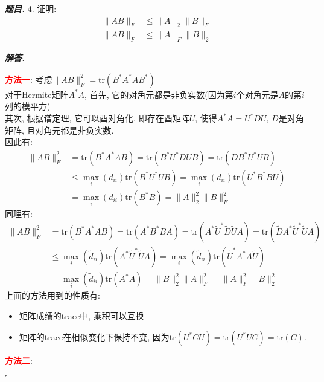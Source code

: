 \documentclass[10pt, a4paper, oneside]{ctexart}
\newcommand{\norm}[1]{\| #1 \|}
\newenvironment{problem}{\begin{framed}\par\noindent\textbf{\textit{题目. }}}{\end{framed}\par}
\newenvironment{solution}{%
  \par\noindent\textbf{\textit{解答. }}\ignorespaces
}{%
  \hfill\ensuremath{\square}\par %
}
\begin{document}
\begin{problem}
4. 证明: 
\begin{align*}
    \norm{AB}_F&\leq \norm{A}_2\norm{B}_F\\
    \norm{AB}_F&\leq \norm{A}_F\norm{B}_2
\end{align*}
\end{problem}

\begin{solution}
\textcolor{red}{\textbf{方法一}}: 考虑$\norm{AB}^2_F=\text{tr}(B^*A^*AB^*)$\\
对于Hermite矩阵$A^*A$, 首先, 它的对角元都是非负实数(因为第$i$个对角元是$A$的第$i$列的模平方)\\
其次, 根据谱定理, 它可以酉对角化, 即存在酉矩阵$U$, 使得$A^*A=U^*DU$, $D$是对角矩阵, 且对角元都是非负实数.\\
因此有:
\begin{align*}
    \norm{AB}_F^2&=\text{tr}(B^*A^*AB)=\text{tr}(B^*U^*DUB)=\text{tr}(DB^*U^*UB)\\&\leq \max_{i}(d_{ii})\text{tr}(B^*U^*UB)=\max_{i}(d_{ii})\text{tr}(U^*B^*BU)\\&=\max_{i}(d_{ii})\text{tr}(B^*B)=\norm{A}_2^2\norm{B}_F^2
\end{align*}
同理有:
\begin{align*}
    \norm{AB}_F^2&=\text{tr}(B^*A^*AB)=\text{tr}(A^*B^*BA)=\text{tr}(A^*\tilde{U}^*\tilde{D}\tilde{U}A)=\text{tr}(\tilde{D}A^*\tilde{U}^*\tilde{U}A)\\&\leq \max_{i}(\tilde{d}_{ii})\text{tr}(A^*\tilde{U}^*\tilde{U}A)=\max_{i}(\tilde{d}_{ii})\text{tr}(\tilde{U}^*A^*A\tilde{U})\\&=\max_{i}(\tilde{d}_{ii})\text{tr}(A^*A)=\norm{B}_2^2\norm{A}_F^2=\norm{A}_F^2\norm{B}_2^2
\end{align*}
上面的方法用到的性质有:
\begin{itemize}
    \item 矩阵成绩的trace中, 乘积可以互换
    \item 矩阵的trace在相似变化下保持不变, 因为$\text{tr}(U^*CU)=\text{tr}(U^*UC)=\text{tr}(C)$.
\end{itemize}

\textcolor{red}{\textbf{方法二}}: 


\end{solution}
\end{document}
